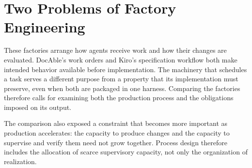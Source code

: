 


\chapter{Two Problems of Factory Engineering}


These factories arrange how agents receive work and how their changes are evaluated. DocAble's work orders and Kiro's specification workflow both make intended behavior available before implementation. The machinery that schedules a task serves a different purpose from a property that its implementation must preserve, even when both are packaged in one harness. Comparing the factories therefore calls for examining both the production process and the obligations imposed on its output.


The comparison also exposed a constraint that becomes more important as production accelerates: the capacity to produce changes and the capacity to supervise and verify them need not grow together. Process design therefore includes the allocation of scarce supervisory capacity, not only the organization of realization.


